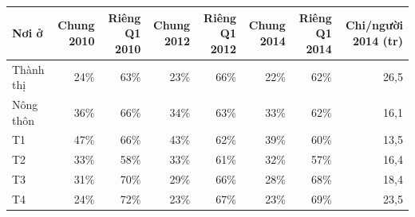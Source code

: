 \begin{tabular}{lrrrrrrr}
\toprule
Nơi ở & Chung 2010 & Riêng Q1 2010 & Chung 2012 & Riêng Q1 2012 & Chung 2014 & Riêng Q1 2014 & Chi/người 2014 (tr) \\
\midrule
Thành thị & 24\% & 63\% & 23\% & 66\% & 22\% & 62\% & 26,5 \\
Nông thôn & 36\% & 66\% & 34\% & 63\% & 33\% & 62\% & 16,1 \\
T1 & 47\% & 66\% & 43\% & 62\% & 39\% & 60\% & 13,5 \\
T2 & 33\% & 58\% & 33\% & 61\% & 32\% & 57\% & 16,4 \\
T3 & 31\% & 70\% & 29\% & 66\% & 28\% & 68\% & 18,4 \\
T4 & 24\% & 72\% & 23\% & 67\% & 23\% & 69\% & 23,5 \\
\bottomrule
\end{tabular}
